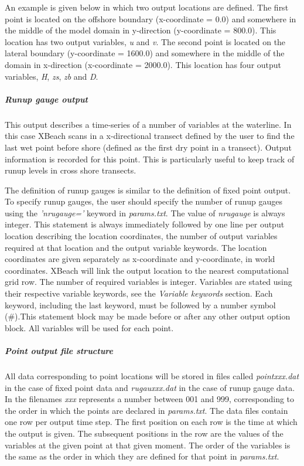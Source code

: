 An example is given below in which two output locations are defined. The first point is located on the offshore boundary (x-coordinate = 0.0) and somewhere in the middle of the model domain in y-direction (y-coordinate = 800.0). This location has two output variables, \textit{u} and \textit{v}. The second point is located on the lateral boundary (y-coordinate = 1600.0) and somewhere in the middle of the domain in x-direction (x-coordinate = 2000.0). This location has four output variables, \textit{H}, \textit{zs}, \textit{zb} and \textit{D}. 


\subparagraph{ Runup gauge output}

This output describes a time-series of a number of variables at the waterline. In this case XBeach scans in a x-directional transect defined by the user to find the last wet point before shore (defined as the first dry point in a transect). Output information is recorded for this point. This is particularly useful to keep track of runup levels in cross shore transects. 

The definition of runup gauges is similar to the definition of fixed point output. To specify runup gauges, the user should specify the number of runup gauges using the \textit{'nrugauge='} keyword in \textit{params.txt}. The value of \textit{nrugauge} is always integer. This statement is always immediately followed by one line per output location describing the location coordinates, the number of output variables required at that location and the output variable keywords. The location coordinates are given separately as x-coordinate and y-coordinate, in world coordinates. XBeach will link the output location to the nearest computational grid row. The number of required variables is integer. Variables are stated using their respective variable keywords, see the \textit{Variable keywords} section. Each keyword, including the last keyword, must be followed by a number symbol (\#).This statement block may be made before or after any other output option block. All variables will be used for each point.
\subparagraph{ Point output file structure}

All data corresponding to point locations will be stored in files called \textit{pointxxx.dat} in the case of fixed point data and \textit{rugauxxx.dat} in the case of runup gauge data. In the filenames \textit{xxx} represents a number between 001 and 999, corresponding to the order in which the points are declared in \textit{params.txt}. The data files contain one row per output time step. The first position on each row is the time at which the output is given. The subsequent positions in the row are the values of the variables at the given point at that given moment. The order of the variables is the same as the order in which they are defined for that point in \textit{params.txt}. 
